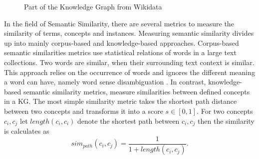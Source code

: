 \documentclass[pdftex,a4paper,12pt]{scrartcl}
\theoremstyle{definition}
\begin{document}
\begin{figure}

    \centering
    \caption{Part of the Knowledge Graph from Wikidata}
    \label{fig:kg}
\end{figure}

In the field of Semantic Similarity, there are several metrics to measure the similarity of terms, concepts and instances.
Measuring semantic similarity divides up into mainly corpus-based and knowledge-based approaches. Corpus-based semantic similarities metrics use statistical relations of words in a large text collections. Two words are similar, when their surrounding text context is similar. This approach relies on the occurrence of words and ignores the different meaning a word can have, namely word sense disambiguation \citep{zhu_computing_2017}. 
In contrast, knowledge-based semantic similarity metrics, measure similarities between defined concepts in a KG. The most simple similarity metric takes the shortest path distance between two concepts and transforms it into a score $s \in [0,1]$. For two concepts $c_i,c_j$ let $length(c_i,c_i)$ denote the shortest path between $c_i,c_j$ then the similarity is calculates as 
\begin{equation}
    sim_{path}(c_i,c_j) = \frac{1}{1+length(c_i,c_j)}.
\end{equation}
\end{document}
